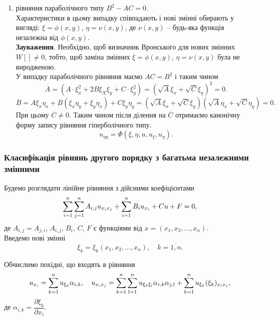 \begin{enumerate}
	\item рівняння параболічного типу $B^2 - AC = 0$. \\

	Характеристики в цьому випадку співпадають і нові змінні обирають у вигляді: $\xi=\phi(x,y)$, $\eta=\nu(x,y)$, де $\nu(x,y)$ -- будь-яка функція незалежна від $\phi(x,y)$. \\

	\textbf{Зауваження}. Необхідно, щоб визначник Вронського для нових змінних $W[]\ne0$, тобто, щоб заміна змінних $\xi = \phi(x, y)$, $\eta = \nu(x,y)$ була не виродженою. \\

	У випадку параболічного рівняння маємо $AC = B^2$ і таким чином 
	\[ \overline{A} = (A \cdot \xi_x^2 + 2 B \xi_X \xi_y + C \cdot \xi_y^2) = \left( \sqrt{A} \xi_x + \sqrt{C} \xi_y \right)^2 = 0. \]
	\[ \overline{B} = A \xi_x \eta_x + B(\xi_x\eta_y+\xi_y\eta_x) + C\xi_y\eta_y = \left(\sqrt{A}\xi_x+\sqrt{C}\xi_y\right)\left(\sqrt{A}\eta_x+\sqrt{C}\eta_y\right) = 0. \]
	При цьому $\overline{C} \ne 0$. Таким чином після ділення на $\overline{C}$ отримаємо канонічну форму запису рівняння гіперболічного типу.
	\begin{equation}
		\label{eq:7.12}
		u_{\eta\eta} = \Phi(\xi,\eta,u,u_\xi,u_\eta).
	\end{equation}
\end{enumerate}

\subsubsection{Класифікація рівнянь другого порядку з багатьма незалежними змінними}

Будемо розглядати лінійне рівняння з дійсними коефіцієнтами
\begin{equation}
	\label{eq:7.13}
	\displaystyle\sum\limits_{i=1}^n \displaystyle\sum\limits_{j=1}^n A_{i,j} u_{x_i x_j} + \displaystyle\sum\limits_{i=1}^n B_i u_{x_i} + Cu + F = 0,
\end{equation}
де $A_{i,j} = A_{j,i}$, $A_{i,j}$, $B_i$, $C$, $F$ є функціями від $x = (x_1, x_2, \ldots, x_n)$. \\

Введемо нові змінні
\begin{equation}
	\label{eq:7.14}
	\xi_k = \xi_k(x_1, x_2, \ldots, x_n), \quad k = \overline{1, n}.
\end{equation}

Обчислимо похідні, що входять в рівняння
\[ u_{x_i} = \displaystyle\sum\limits_{k=1}^n u_{\xi_k} \alpha_{i,k}, \quad u_{x_i x_j} = \displaystyle\sum\limits_{k=1}^n \displaystyle\sum\limits_{l=1}^n u_{\xi_k\xi_l} \alpha_{i,k}\alpha_{j,l} + \displaystyle\sum\limits_{k=1}^n u_{\xi_k} (\xi_k)_{x_ix_j}, \]
де $\alpha_{i,k} = \dfrac{\partial \xi_k}{\partial x_i}$. \\

